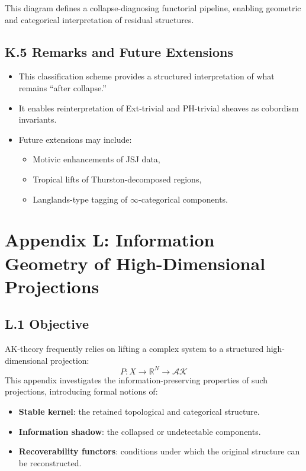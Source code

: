 \documentclass[11pt]{article}
\begin{document}
This diagram defines a collapse-diagnosing functorial pipeline, enabling geometric and categorical interpretation of residual structures.

\subsection*{K.5 Remarks and Future Extensions}

\begin{itemize}
  \item This classification scheme provides a structured interpretation of what remains “after collapse.”
  \item It enables reinterpretation of Ext-trivial and PH-trivial sheaves as cobordism invariants.
  \item Future extensions may include:
  \begin{itemize}
    \item Motivic enhancements of JSJ data,
    \item Tropical lifts of Thurston-decomposed regions,
    \item Langlands-type tagging of $\infty$-categorical components.
  \end{itemize}
\end{itemize}



\section*{Appendix L: Information Geometry of High-Dimensional Projections}

\subsection*{L.1 Objective}

AK-theory frequently relies on lifting a complex system to a structured high-dimensional projection:
\[
P: X \longrightarrow \mathbb{R}^N \longrightarrow \mathcal{AK}
\]
This appendix investigates the information-preserving properties of such projections, introducing formal notions of:
\begin{itemize}
  \item \textbf{Stable kernel}: the retained topological and categorical structure.
  \item \textbf{Information shadow}: the collapsed or undetectable components.
  \item \textbf{Recoverability functors}: conditions under which the original structure can be reconstructed.
\end{itemize}
\end{document}

